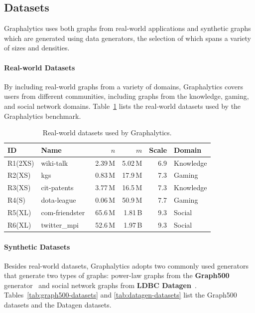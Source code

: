 \subsection{Datasets}\label{sec:definition_datasets}
Graphalytics uses both graphs from real-world applications and synthetic graphs which are generated using data generators, the selection of which spans a variety of sizes and densities.

\paragraph{Real-world Datasets} By including real-world graphs from a variety of domains, Graphalytics covers users from different communities, including graphs from the knowledge, gaming, and social network domains.  Table~\ref{tab:real-datasets} lists the real-world datasets used by the Graphalytics benchmark.

\begin{table}[h]
\caption{Real-world datasets used by Graphalytics.}
\label{tab:real-datasets}
\centering
\begin{tabular}{|l|l|r|r|r|l|}
\hline
\textbf{ID} & \textbf{Name} & \textbf{$n$} & \textbf{$m$} & \textbf{Scale} & \textbf{Domain} \\
\hline
R1(2XS) & wiki-talk~\cite{snapnets} & 2.39\,M & 5.02\,M & 6.9 & Knowledge \\
\hline
R2(XS) & kgs~\cite{guo2012game} & 0.83\,M & 17.9\,M & 7.3 & Gaming \\
\hline
R3(XS) & cit-patents~\cite{snapnets} & 3.77\,M & 16.5\,M & 7.3 & Knowledge \\
\hline
R4(S) & dota-league~\cite{guo2012game} & 0.06\,M & 50.9\,M & 7.7 & Gaming \\
\hline
R5(XL) & com-friendster~\cite{snapnets} & 65.6\,M & 1.81\,B & 9.3 & Social \\
\hline
R6(XL) & twitter\_mpi~\cite{icwsm10cha} & 52.6\,M & 1.97\,B & 9.3 & Social \\
\hline
\end{tabular}
\end{table}





\paragraph{Synthetic Datasets} Besides real-world datasets, Graphalytics adopts two commonly used generators that generate two types of graphs: power-law graphs from the \textbf{Graph500} generator~\cite{chakrabarti2004, murphy2010} and social network graphs from \textbf{LDBC Datagen}~\cite{DBLP:conf/sigmod/ErlingALCGPPB15}. Tables~\ref{tab:graph500-datasets} and \ref{tab:datagen-datasets} list the Graph500 datasets and the Datagen datasets.



